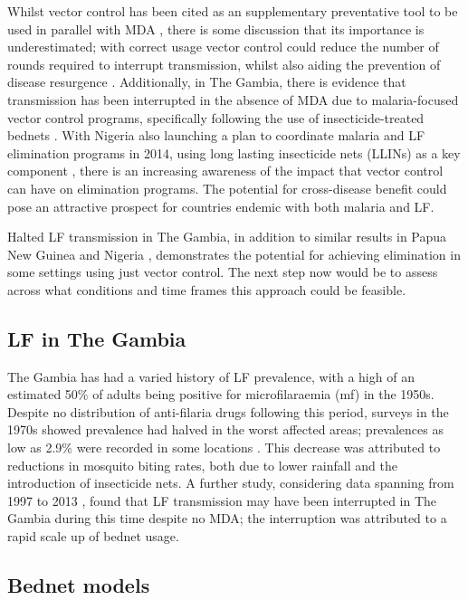 \documentclass[5p,times]{elsarticle}
\begin{document}
Whilst vector control has been cited as an supplementary preventative tool to be used in parallel with MDA \cite{WHOfactsheet}, there is some discussion that its importance is underestimated; with correct usage vector control could reduce the number of rounds required to interrupt transmission, whilst also aiding the prevention of disease resurgence \cite{bockarie2009}. Additionally, in The Gambia, there is evidence that transmission has been interrupted in the absence of MDA due to malaria-focused vector control programs, specifically following the use of insecticide-treated bednets \cite{rebollo2015}. With Nigeria also launching a plan to coordinate malaria and LF elimination programs in 2014, using long lasting insecticide nets (LLINs) as a key component \cite{Nigeria}, there is an increasing awareness of the impact that vector control can have on elimination programs. The potential for cross-disease benefit could pose an attractive prospect for countries endemic with both malaria and LF.   

Halted LF transmission in The Gambia, in addition to similar results in Papua New Guinea \cite{reimer2013} and Nigeria \cite{richards2013}, demonstrates the potential for achieving elimination in some settings using just vector control. The next step now would be to assess across what conditions and time frames this approach could be feasible.

\subsection{LF in The Gambia}

The Gambia has had a varied history of LF prevalence, with a high of an estimated 50\% of adults being positive for microfilaraemia (mf) in the 1950s. Despite no distribution of anti-filaria drugs following this period, surveys in the 1970s showed prevalence had halved in the worst affected areas; prevalences as low as 2.9\% were recorded in some locations \cite{knight1980}. This decrease was attributed to reductions in mosquito biting rates, both due to lower rainfall and the introduction of insecticide nets. A further study, considering data spanning from 1997 to 2013 \cite{rebollo2015}, found that LF transmission may have been interrupted in The Gambia during this time despite no MDA; the interruption was attributed to a rapid scale up of bednet usage.

\subsection{Bednet models}
\end{document}
